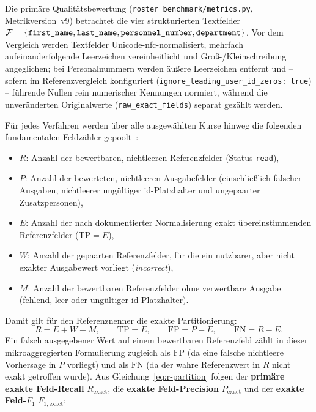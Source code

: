 Die primäre Qualitätsbewertung (\texttt{roster\_benchmark/metrics.py}, Metrikversion~v9) betrachtet die vier strukturierten Textfelder $\mathcal{F} = \{\text{\texttt{first\_name}}, \text{\texttt{last\_name}}, \text{\texttt{personnel\_number}}, \text{\texttt{department}}\}$. Vor dem Vergleich werden Textfelder Unicode-\ac{nfc}-normalisiert, mehrfach aufeinanderfolgende Leerzeichen vereinheitlicht und Groß-/Kleinschreibung angeglichen; bei Personalnummern werden äußere Leerzeichen entfernt und -- sofern im Referenzvergleich konfiguriert (\texttt{ignore\_leading\_user\_id\_zeros: true}) -- führende Nullen rein numerischer Kennungen normiert, während die unveränderten Originalwerte (\texttt{raw\_exact\_fields}) separat gezählt werden.

Für jedes Verfahren werden über alle ausgewählten Kurse hinweg die folgenden fundamentalen Feldzähler gepoolt~\cite{Sokolova2009Measures}:
\begin{itemize}
  \item $R$: Anzahl der bewertbaren, nichtleeren Referenzfelder (Status \texttt{read}),
  \item $P$: Anzahl der bewerteten, nichtleeren Ausgabefelder (einschließlich falscher Ausgaben, nichtleerer ungültiger \ac{id}-Platzhalter und ungepaarter Zusatzpersonen),
  \item $E$: Anzahl der nach dokumentierter Normalisierung exakt übereinstimmenden Referenzfelder ($\mathrm{TP} = E$),
  \item $W$: Anzahl der gepaarten Referenzfelder, für die ein nutzbarer, aber nicht exakter Ausgabewert vorliegt (\emph{incorrect}),
  \item $M$: Anzahl der bewertbaren Referenzfelder ohne verwertbare Ausgabe (fehlend, leer oder ungültiger \ac{id}-Platzhalter).
\end{itemize}
Damit gilt für den Referenznenner die exakte Partitionierung:
\begin{equation}
  R = E + W + M, \qquad \mathrm{TP} = E, \qquad \mathrm{FP} = P - E, \qquad \mathrm{FN} = R - E.
  \label{eq:r-partition}
\end{equation}
Ein falsch ausgegebener Wert auf einem bewertbaren Referenzfeld zählt in dieser mikroaggregierten Formulierung zugleich als $\mathrm{FP}$ (da eine falsche nichtleere Vorhersage in $P$ vorliegt) und als $\mathrm{FN}$ (da der wahre Referenzwert in $R$ nicht exakt getroffen wurde). Aus Gleichung~\eqref{eq:r-partition} folgen der \textbf{primäre exakte Feld-Recall} $R_{\mathrm{exact}}$, die \textbf{exakte Feld-Precision} $P_{\mathrm{exact}}$ und der \textbf{exakte Feld-$F_1$} $F_{1,\mathrm{exact}}$:

